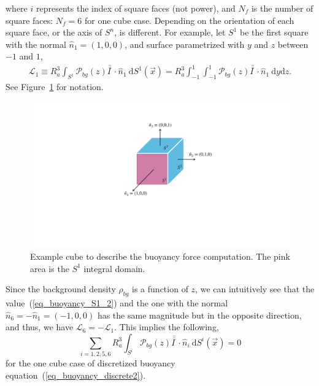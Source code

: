 where $i$ represents the index of square faces (not power), and $N_f$ is the number of square faces: $N_f = 6$ for one cube case. Depending on the orientation of each square face, or the axis of $S^n$, is different. For example, let $S^1$ be the first square with the normal $\hat{n}_1 = (1,0,0)$, and surface parametrized with $y$ and $z$ between $-1$ and $1$,
\begin{align}
	\mathcal{L}_1 \equiv 
	R_a^3 
	 \int_{S^1}
	 \mathcal{P}_{bg}(z) 
	  \bar{\bar{I \ }}  \cdot
	\hat{n}_1 \ \textrm{d}S^1 (\vec{x})
	= R_a^3  \int_{-1}^{1} \int_{-1}^{1}
	\mathcal{P}_{bg}(z) 
	\bar{\bar{I \ }}  \cdot
 	\hat{n}_1 \ 
	\textrm{d}y  \textrm{d}z.
\label{eq_buoyancy_S1_2}
\end{align}
See Figure~\ref{fig_rho_bg_on_S1} for notation.
\begin{figure}[h]
	\begin{center}
		\includegraphics[scale=0.3]{./figures/fig_rho_bg_on_S1.pdf}
	\caption{Example cube to describe the buoyancy force computation. The pink area is the $S^1$ integral domain.}
	\label{fig_rho_bg_on_S1}
\end{center}
\end{figure}
Since the background density $\rho_{bg}$ is a function of $z$, we can intuitively see that the value~(\ref{eq_buoyancy_S1_2}) and the one with the normal $\hat{n}_6 = -\hat{n}_1 = (-1,0,0)$ has the same magnitude but in the opposite direction, and thus, we have $\mathcal{L}_6 = -\mathcal{L}_1$. 
This implies the following,
\begin{equation}
	\sum_{i=1,2,5,6}
	 R_a^3 \int_{S^i} 
	 \mathcal{P}_{bg}(z) 
	 \bar{\bar{I \ }}  \cdot
	\hat{n}_i \ \textrm{d}S^i (\vec{x})
	 = 0
\label{eq_buoyancy_zero_oneCube}
\end{equation}
for the one cube case of discretized buoyancy equation~(\ref{eq_buoyancy_discrete2}).
